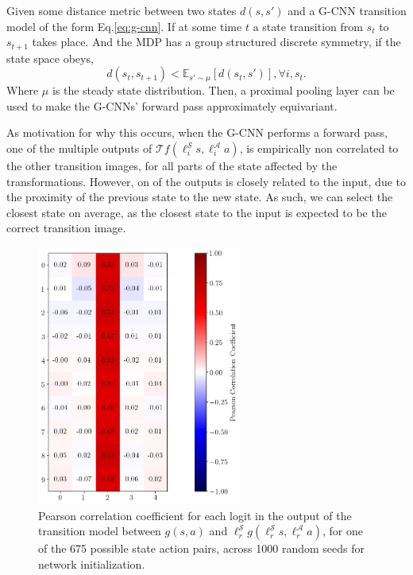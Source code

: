\begin{proposition}
	Given some distance metric between two states $d(s, s')$ and a G-CNN transition model of the form Eq.\ref{eq:g-cnn}. If at some time $t$ a state transition from $s_t$ to $s_{t+1}$ takes place. And the MDP has a group structured discrete symmetry, if the state space obeys,
	\begin{equation}
		d(s_t, s_{t+1}) < \mathbb{E}_{s'\sim \mu}[d(s_t, s')], \forall i, s_t.
	\end{equation}
	Where $\mu$ is the steady state distribution. Then, a proximal pooling layer can be used to make the G-CNNs' forward pass approximately equivariant.
\end{proposition}
As motivation for why this occurs, when the G-CNN performs a forward pass, one of the multiple outputs of $\mathcal{T} f(\ell_i^\mathcal{S}s,\ell_i^\mathcal{A} a)$, is empirically non correlated to the other transition images, for all parts of the state affected by the transformations. However, on of the outputs is closely related to the input, due to the proximity of the previous state to the new state. As such, we can select the closest state on average, as the closest state to the input is expected to be the correct transition image.
\begin{figure}[h!]
	\centering
	\includegraphics[width = 0.6\textwidth]{Figures/logits_correlation.png}
	\caption{Pearson correlation coefficient for each logit in the output of the transition model between $g(s, a)$ and $\ell_r^\mathcal{S}g(\ell_r^\mathcal{S}s,\ell_r^\mathcal{A}a)$, for one of the 675 possible state action pairs, across 1000 random  seeds for network initialization. }
	\label{fig:logits_correlation}
\end{figure}
